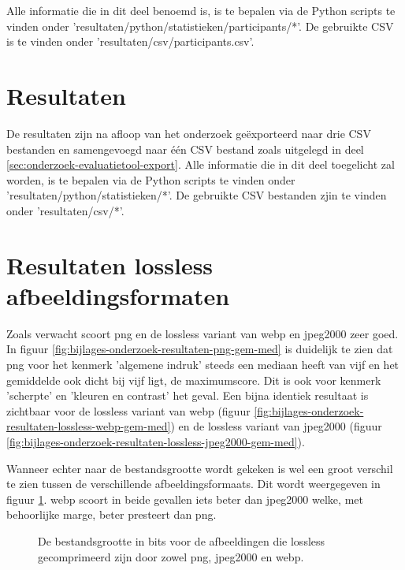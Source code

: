 Alle informatie die in dit deel benoemd is, is te bepalen via de Python scripts te vinden onder 'resultaten/python/statistieken/participants/*'. De gebruikte CSV is te vinden onder 'resultaten/csv/participants.csv'.

\section{Resultaten}
\label{sec:onderzoek-resultaten}

De resultaten zijn na afloop van het onderzoek geëxporteerd naar drie CSV bestanden en samengevoegd naar één CSV bestand zoals uitgelegd in deel \ref{sec:onderzoek-evaluatietool-export}. Alle informatie die in dit deel toegelicht zal worden, is te bepalen via de Python scripts te vinden onder 'resultaten/python/statistieken/*'. De gebruikte CSV bestanden zjin te vinden onder 'resultaten/csv/*'.

\section{Resultaten lossless afbeeldingsformaten}
\label{sec:onderzoek-resultaten-lossles}

Zoals verwacht scoort \gls{png} en de \gls{lossless} variant van \gls{webp} en \gls{jpeg2000} zeer goed. In figuur \ref{fig:bijlages-onderzoek-resultaten-png-gem-med} is duidelijk te zien dat \gls{png} voor het kenmerk 'algemene indruk' steeds een mediaan heeft van vijf en het gemiddelde ook dicht bij vijf ligt, de maximumscore. Dit is ook voor kenmerk 'scherpte' en 'kleuren en contrast' het geval. Een bijna identiek resultaat is zichtbaar voor de \gls{lossless} variant van \gls{webp} (figuur \ref{fig:bijlages-onderzoek-resultaten-lossless-webp-gem-med}) en de \gls{lossless} variant van \gls{jpeg2000} (figuur \ref{fig:bijlages-onderzoek-resultaten-lossless-jpeg2000-gem-med}).

Wanneer echter naar de bestandsgrootte wordt gekeken is wel een groot verschil te zien tussen de verschillende \glspl{afbeeldingsformaat}. Dit wordt weergegeven in figuur \ref{fig:onderzoek-resultaten-lossless-sizes}. \Gls{webp} scoort in beide gevallen iets beter dan \gls{jpeg2000} welke, met behoorlijke marge, beter presteert dan \gls{png}.  

\begin{figure}[]
	\centering
	\caption{De bestandsgrootte in \glspl{bit} voor de afbeeldingen die \gls{lossless} gecomprimeerd zijn door zowel \gls{png}, \gls{jpeg2000} en \gls{webp}.}
	\label{fig:onderzoek-resultaten-lossless-sizes}
\end{figure}

